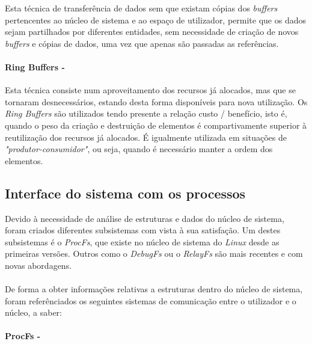 Esta técnica de transferência de dados sem que existam cópias dos \textit{buffers} pertencentes ao núcleo de sistema e ao espaço de utilizador, permite que os dados sejam partilhados por diferentes entidades, sem necessidade de criação de novos \textit{buffers} e cópias de dados, uma vez que apenas são passadas as referências.

\paragraph*{Ring Buffers - }

Esta técnica consiste num aproveitamento dos recursos já alocados, mas que se tornaram desnecessários, estando desta forma disponíveis para nova utilização.
Os \textit{Ring Buffers} são utilizados tendo presente a relação custo / benefício, isto é, quando o peso da criação e destruição de elementos é compartivamente superior à reutilização dos recursos já alocados.
É igualmente utilizada em situações de \textit{"produtor-consumidor"}, ou seja, quando é necessário manter a ordem dos elementos.


\subsection{Interface do sistema com os processos}
% 

Devido à necessidade de análise de estruturas e dados do núcleo de sistema, foram criados diferentes subsistemas com vista à sua satisfação.
Um destes subsistemas é o \textit{ProcFs}, que existe no núcleo de sistema do \textit{Linux} desde as primeiras versões.
Outros como o \textit{DebugFs} ou o \textit{RelayFs} são mais recentes e com novas abordagens.

\paragraph*{}
De forma a obter informações relativas a estruturas dentro do núcleo de sistema, foram referênciados os seguintes sistemas de comunicação entre o utilizador e o núcleo, a saber:

\paragraph*{ProcFs - }\label{cap:ProcFs_overview}

